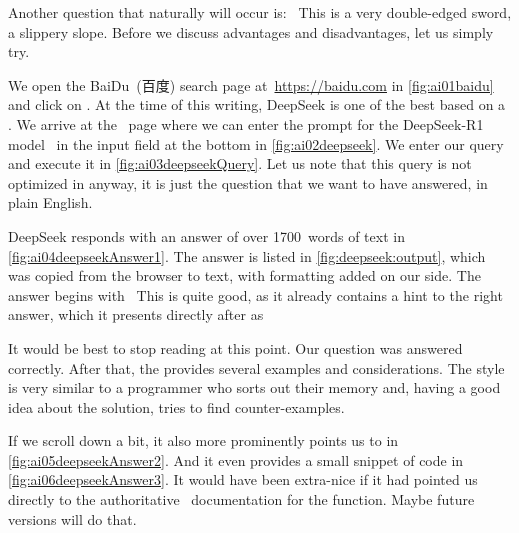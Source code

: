 %
Another question that naturally will occur is:~
This is a very double-edged sword, a slippery slope.
Before we discuss advantages and disadvantages, let us simply try.

We open the BaiDu~(百度) search page at~\url{https://baidu.com} in \cref{fig:ai01baidu} and click on .
At the time of this writing, DeepSeek is one of the best  based on a .
We arrive at the ~page where we can enter the prompt for the DeepSeek\nobreakdashes-R1 model~\cite{DAGYZSZXZMWBZYWWGSLGLXWWFLZDZRDCJLLDLHCLZBXWDXGQLGLWCYQLCNLCDHGGHYWZZWZXXZZTLWLTHZWCDGZPWCJCLZCYWYZPL2024DRIRCILVRL} in the input field at the bottom in \cref{fig:ai02deepseek}.
We enter our query~ and execute it in \cref{fig:ai03deepseekQuery}.
Let us note that this query is not optimized in anyway, it is just the question that we want to have answered, in plain English.

DeepSeek responds with an answer of over 1700~words of text in \cref{fig:ai04deepseekAnswer1}.
The answer is listed in \cref{fig:deepseek:output}, which was copied from the browser to text, with formatting added on our side.
The answer begins with~\emph{}
This is quite good, as it already contains a hint to the right answer, which it presents directly after as~\emph{}

It would be best to stop reading at this point.
Our question was answered correctly.
After that, the  provides several examples and considerations.
The style is very similar to a programmer who sorts out their memory and, having a good idea about the solution, tries to find counter-examples.

If we scroll down a bit, it also more prominently points us to  in \cref{fig:ai05deepseekAnswer2}.
And it even provides a small snippet of code in \cref{fig:ai06deepseekAnswer3}.
It would have been extra-nice if it had pointed us directly to the authoritative \python\ documentation for the function.
Maybe future versions will do that.

